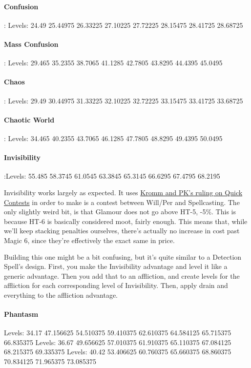 \begin{multicols*}{2}
	\paragraph{Confusion}: Levels: 24.49 25.44975 26.33225 27.10225 27.72225 28.15475 28.41725 28.68725
	
	\paragraph{Mass Confusion}: Levels: 29.465 35.2355 38.7065 41.1285 42.7805 43.8295 44.4395 45.0495
	
	\paragraph{Chaos}: Levels: 29.49 30.44975 31.33225 32.10225 32.72225 33.15475 33.41725 33.68725
	
	\paragraph{Chaotic World}: Levels: 34.465 40.2355 43.7065 46.1285 47.7805 48.8295 49.4395 50.0495
	
	\paragraph{Invisibility}:Levels: 55.485 58.3745 61.0545 63.3845 65.3145 66.6295 67.4795 68.2195
	
	Invisibility works largely as expected. It uses \href{http://forums.sjgames.com/showpost.php?p=669736&postcount=2}{Kromm and PK's ruling on Quick Contests} in order to make is a contest between Will/Per and Spellcasting. The only slightly weird bit, is that Glamour does not go above HT-5, -5\%. This is because HT-6 is basically considered moot, fairly enough. This means that, while we'll keep stacking penalties ourselves, there's actually no increase in cost past Magic 6, since they're effectively the exact same in price.
	
	Building this one might be a bit confusing, but it's quite similar to  a Detection Spell's design. First, you make the Invisibility advantage and level it like a generic advantage. Then you add that to an affliction, and create levels for the affliction for each corresponding level of Invisibility. Then, apply drain and everything to the affliction advantage.
	
	\paragraph{Phantasm}
	Levels: 34.17 47.156625 54.510375 59.410375 62.610375 64.584125 65.715375 66.835375
	Levels: 36.67 49.656625 57.010375 61.910375 65.110375 67.084125 68.215375 69.335375
	Levels: 40.42 53.406625 60.760375 65.660375 68.860375 70.834125 71.965375 73.085375
	

\end{multicols*}
